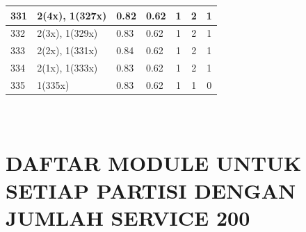 \begin{small}
\begin{longtable}{|p{0.5cm}|p{9cm}|p{1.3cm}|p{1.3cm}|c|c|c|}
  331 & 2(4x), 1(327x) & \cellcolor{colorBad}  0.82 & \cellcolor{colorBad} 0.62 & 1 & 2 & \cellcolor{colorGood} 1 \\   \hline
  332 & 2(3x), 1(329x) & \cellcolor{colorBad}  0.83 & \cellcolor{colorBad} 0.62 & 1 & 2 & \cellcolor{colorGood} 1 \\   \hline
  333 & 2(2x), 1(331x) & \cellcolor{colorBad}  0.84 & \cellcolor{colorBad} 0.62 & 1 & 2 & \cellcolor{colorGood} 1 \\   \hline
  334 & 2(1x), 1(333x) & \cellcolor{colorBad}  0.83 & \cellcolor{colorBad} 0.62 & 1 & 2 & \cellcolor{colorGood} 1 \\   \hline
  335 & 1(335x) & \cellcolor{colorBad}  0.83 & \cellcolor{colorBad} 0.62 & 1 & 1 & \cellcolor{colorGood} 0 \\   \hline  
\end{longtable}
\end{small}
\endgroup


\chapter{\\ DAFTAR MODULE UNTUK SETIAP PARTISI DENGAN JUMLAH SERVICE 200}

